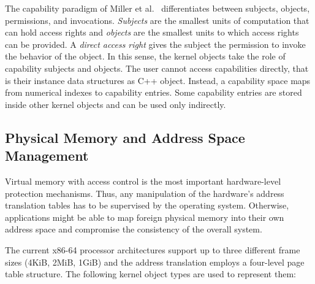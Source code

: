 The capability paradigm of Miller et al.~\cite{Miller2005} differentiates between subjects, objects, permissions, and invocations. 
\emph{Subjects} are the smallest units of computation that can hold access rights and \emph{objects} are the smallest units to which access rights can be provided. 
A \emph{direct access right} gives the subject the permission to invoke the behavior of the object.
In this sense, the kernel objects take the role of capability subjects and objects. 
The user cannot access capabilities directly, that is their instance data structures as C++ object. Instead, a capability space maps from numerical indexes to capability entries. Some capability entries are stored inside other kernel objects and can be used only indirectly. 


\subsection{Physical Memory and Address Space Management}
\label{sec:memory-impl}

Virtual memory with access control is the most important hardware-level protection mechanisms. Thus, any manipulation of the hardware's address translation tables has to be supervised by the operating system. Otherwise, applications might be able to map foreign physical memory into their own address space and compromise the consistency of the overall system. 

The current x86-64 processor architectures support up to three different frame sizes (4KiB, 2MiB, 1GiB) and the address translation employs a four-level page table structure. The following kernel object types are used to represent them:

